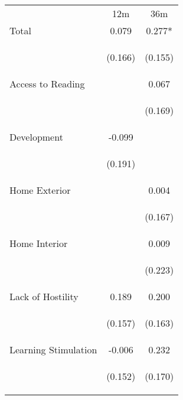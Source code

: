 \begin{tabular}{lcc}
\hline \noalign{\smallskip} & 12m & 36m\\
\noalign{\smallskip}\hline \noalign{\smallskip}Total & 0.079 & 0.277*\\
 & \begin{footnotesize}(0.166)\end{footnotesize} & \begin{footnotesize}(0.155)\end{footnotesize}\\
\noalign{\smallskip}Access to Reading &  & 0.067\\
 & \begin{footnotesize}\end{footnotesize} & \begin{footnotesize}(0.169)\end{footnotesize}\\
\noalign{\smallskip}Development & -0.099 & \\
 & \begin{footnotesize}(0.191)\end{footnotesize} & \begin{footnotesize}\end{footnotesize}\\
\noalign{\smallskip}Home Exterior &  & 0.004\\
 & \begin{footnotesize}\end{footnotesize} & \begin{footnotesize}(0.167)\end{footnotesize}\\
\noalign{\smallskip}Home Interior &  & 0.009\\
 & \begin{footnotesize}\end{footnotesize} & \begin{footnotesize}(0.223)\end{footnotesize}\\
\noalign{\smallskip}Lack of Hostility & 0.189 & 0.200\\
 & \begin{footnotesize}(0.157)\end{footnotesize} & \begin{footnotesize}(0.163)\end{footnotesize}\\
\noalign{\smallskip}Learning Stimulation & -0.006 & 0.232\\
 & \begin{footnotesize}(0.152)\end{footnotesize} & \begin{footnotesize}(0.170)\end{footnotesize}\\

\end{tabular}

